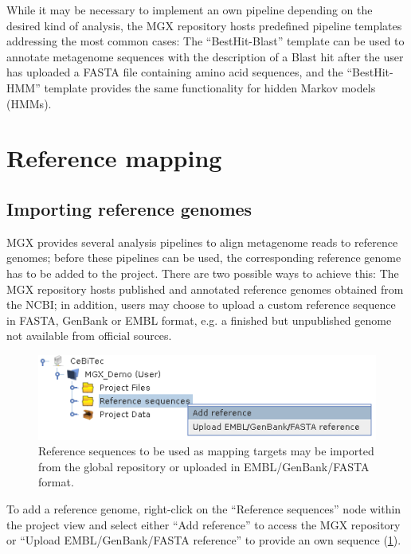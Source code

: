 While it may be necessary to implement an own pipeline depending on the
desired kind of analysis, the MGX repository hosts predefined pipeline
templates addressing the most common cases: The ``BestHit-Blast'' template
can be used to annotate metagenome sequences with the description of a
Blast hit after the user has uploaded a FASTA file containing amino acid
sequences, and the ``BestHit-HMM'' template provides the same functionality
for hidden Markov models (HMMs).


\section{Reference mapping}

\subsection{Importing reference genomes}

MGX provides several analysis pipelines to align metagenome reads to reference genomes;
before these pipelines can be used, the corresponding reference genome has to be added
to the project. There are two possible ways to achieve this: The MGX repository hosts
published and annotated reference genomes obtained from the NCBI; in addition, users
may choose to upload a custom reference sequence in FASTA, GenBank or EMBL format, e.g.
a finished but unpublished genome not available from official sources.\\

\begin{figure}[H]
\centering
\includegraphics[width=.9\textwidth]{img/mgx/addReference}
\caption[Reference import]{Reference sequences to be used as mapping targets may be
imported from the global repository or uploaded in EMBL/GenBank/FASTA format.}
\label{addref}
\end{figure}

To add a reference genome, right-click on the ``Reference sequences'' node within the
project view and select either ``Add reference'' to access the MGX repository or
``Upload EMBL/GenBank/FASTA reference'' to provide an own sequence (\ref{addref}).\\

